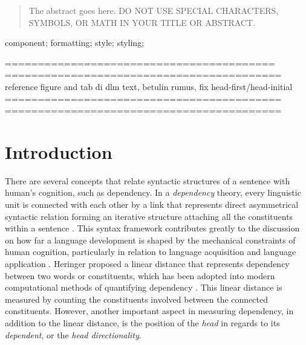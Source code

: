 \documentclass[10pt, a4paper, conference, compsocconf]{IEEEtran}
\begin{document}
\maketitle


\begin{abstract}
The abstract goes here. DO NOT USE SPECIAL CHARACTERS, SYMBOLS, OR MATH IN YOUR TITLE OR ABSTRACT.

\end{abstract}

\begin{IEEEkeywords}
component; formatting; style; styling;

\end{IEEEkeywords}


%
\IEEEpeerreviewmaketitle

=========================================
==========================================
reference figure and tab di dlm text, betulin rumus, fix head-first/head-initial
==========================================
==========================================

\section{Introduction}

There are several concepts that relate syntactic structures of a sentence with human's cognition, such as dependency. In a \textit{dependency} theory, every linguistic unit is connected with each other by a link that represents direct asymmetrical syntactic relation forming an iterative structure attaching all the constituents within a sentence \cite{tesniere1959elements}. This syntax framework contributes greatly to the discussion on how far a language development is shaped by the mechanical constraints of human cognition, particularly in relation to language acquisition and language application \cite{plotkin2000language}. Heringer proposed a linear distance that represents dependency between two words or constituents, which has been adopted into modern computational methods of quantifying dependency \cite{heringer1993dependency}. This linear distance is measured by counting the constituents involved between the connected constituents. However, another important aspect in measuring dependency, in addition to the linear distance, is the position of the \textit{head} in regards to its \textit{dependent}, or the \textit{head directionality}. 
\end{document}
